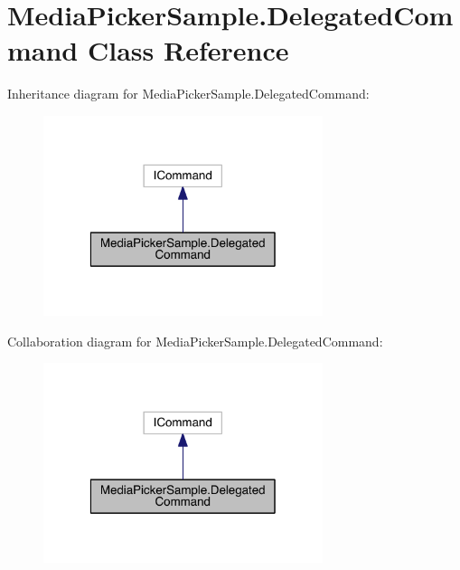 \hypertarget{class_media_picker_sample_1_1_delegated_command}{\section{Media\+Picker\+Sample.\+Delegated\+Command Class Reference}
\label{class_media_picker_sample_1_1_delegated_command}
}


Inheritance diagram for Media\+Picker\+Sample.\+Delegated\+Command\+:
\nopagebreak
\begin{figure}[H]
\begin{center}
\leavevmode
\includegraphics[width=232pt]{class_media_picker_sample_1_1_delegated_command__inherit__graph}
\end{center}
\end{figure}


Collaboration diagram for Media\+Picker\+Sample.\+Delegated\+Command\+:
\nopagebreak
\begin{figure}[H]
\begin{center}
\leavevmode
\includegraphics[width=232pt]{class_media_picker_sample_1_1_delegated_command__coll__graph}
\end{center}
\end{figure}

